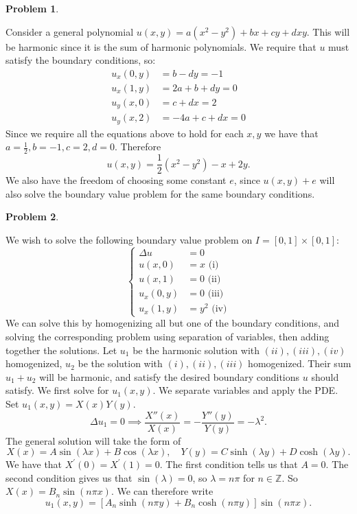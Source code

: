 \documentclass[12pt, a4paper]{article}
\title{}
\author{A.N.}
\date{\today}
\newtheorem{problem}{Problem}
\theoremstyle{definition}
\newcommand{\Z}{\mathbb{Z}}                           %
\begin{document}
\begin{problem}
\end{problem}
Consider a general polynomial $u(x,y) = a(x^2 - y^2)  + bx + cy + dxy$. This will be harmonic since it is the sum of harmonic polynomials. 
We require that $u$ must satisfy the boundary conditions, so: 
\begin{align*}
	u_x(0,y) &= b-dy = -1
	\\ u_x(1,y) & = 2a+b+dy = 0
	\\ u_y(x,0) & = c+dx = 2
	\\ u_y(x,2) & = -4a + c + dx = 0
\end{align*}
Since we require all the equations above to hold for each $x,y$ we have that $a = \frac{1}{2}, b = -1 , c = 2, d = 0$. Therefore $$u(x,y) = \frac{1}{2}(x^2-y^2) - x +2y.$$
We also have the freedom of choosing some constant $e$, since $u(x,y) + e$ will also solve the boundary value problem for the same boundary conditions. 
\newpage
\begin{problem}
\end{problem}
We wish to solve the following boundary value problem  on $I = [0,1] \times [0,1]$: 
$$\begin{cases}
	\Delta u & = 0 \\
	u(x,0) & = x  \text{ (i)}\\
	u(x,1) & = 0 \text{ (ii)} \\
	u_x(0,y) & = 0 \text{ (iii)}\\
	u_x(1,y) & =y^2 \text{ (iv)}
\end{cases}$$
We can solve this by homogenizing all but one of the boundary conditions, and solving the corresponding problem using separation of variables, then adding together the solutions. Let $u_1$ be the harmonic solution with $(ii), (iii), (iv)$ homogenized, $u_2$ be the solution with $(i) , (ii), (iii)$ homogenized. Their sum $u_1 + u_2$ will be harmonic, and satisfy the desired boundary conditions $u$ should satisfy. We first solve for $u_1(x,y)$. 
We separate variables and apply the PDE. Set $u_1(x,y) = X(x)Y(y)$. 
$$\Delta u_1 = 0 \implies \frac{X''(x)}{X(x)} = - \frac{Y''(y)}{Y(y)} = -\lambda^2.$$
The general solution will take the form of $$X(x) = A\sin (\lambda x) + B \cos (\lambda x), \quad Y(y ) = C \sinh (\lambda y) + D \cosh (\lambda y). $$
We have that $X^\prime(0) = X^\prime(1) = 0$. The first condition tells us that $A=0$. The second condition gives us that $\sin(\lambda) = 0$, so $\lambda = n\pi$ for $n\in \Z$. 
So $X(x) = B_n \sin(n\pi x)$. We can therefore write 
$$u_1(x,y) = \left[A_n \sinh (n\pi y) + B_n \cosh(n\pi y)\right] \sin (n\pi x).$$ 
\end{document}
